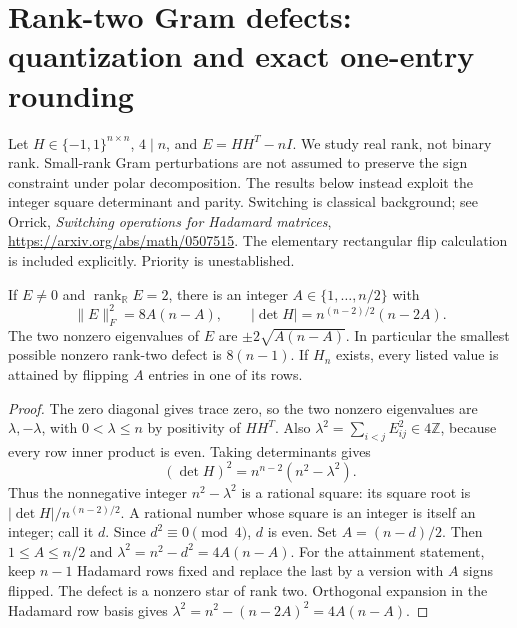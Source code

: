 \section{Rank-two Gram defects: quantization and exact one-entry rounding}
\label{sec:spectral-rank-two}
Let $H\in\{-1,1\}^{n\times n}$, $4\mid n$, and
$E=HH^T-nI$. We study real rank, not binary rank. Small-rank Gram
perturbations are not assumed to preserve the sign constraint under
polar decomposition. The results below instead exploit the integer
square determinant and parity. Switching is classical background; see
Orrick, \emph{Switching operations for Hadamard matrices},
\url{https://arxiv.org/abs/math/0507515}. The elementary rectangular
flip calculation is included explicitly. Priority is unestablished.

\begin{theorem}
\label{thm:spectral-quantization}
If $E\ne0$ and $\operatorname{rank}_{\mathbb R}E=2$, there is an integer
$A\in\{1,\ldots,n/2\}$ with
\[
 \|E\|_F^2=8A(n-A),\qquad
 |\det H|=n^{(n-2)/2}(n-2A).
\]
The two nonzero eigenvalues of $E$ are
$\pm2\sqrt{A(n-A)}$. In particular the smallest possible nonzero
rank-two defect is $8(n-1)$. If $H_n$ exists, every listed value is
attained by flipping $A$ entries in one of its rows.
\end{theorem}
\begin{proof}
The zero diagonal gives trace zero, so the two nonzero eigenvalues are
$\lambda,-\lambda$, with $0<\lambda\le n$ by positivity of $HH^T$.
Also $\lambda^2=\sum_{i<j}E_{ij}^2\in4\mathbb Z$, because every
row inner product is even. Taking determinants gives
\[
 (\det H)^2=n^{n-2}(n^2-\lambda^2).
\]
Thus the nonnegative integer $n^2-\lambda^2$ is a rational square:
its square root is $|\det H|/n^{(n-2)/2}$. A rational number whose
square is an integer is itself an integer; call it $d$. Since
$d^2\equiv0\pmod4$, $d$ is even. Set $A=(n-d)/2$.
Then $1\le A\le n/2$ and $\lambda^2=n^2-d^2=4A(n-A)$.
For the attainment statement, keep $n-1$ Hadamard rows fixed and replace
the last by a version with $A$ signs flipped. The defect is a nonzero
star of rank two. Orthogonal expansion in the Hadamard row basis gives
$\lambda^2=n^2-(n-2A)^2=4A(n-A)$.
\end{proof}

